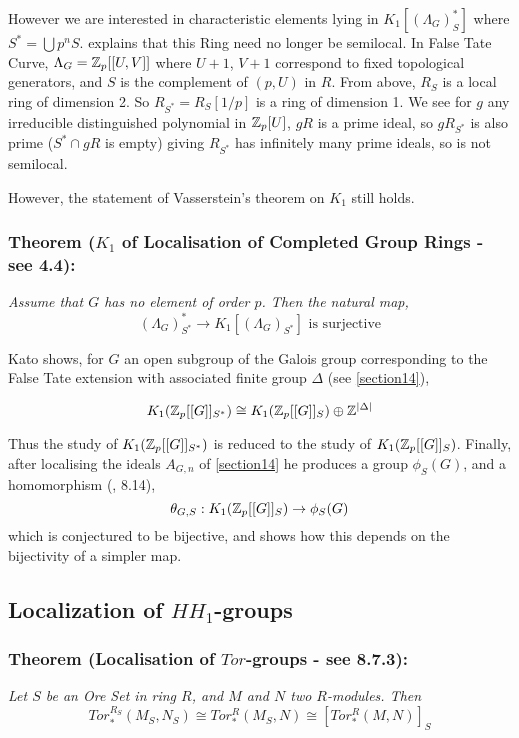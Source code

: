 However we are interested in characteristic elements lying in $K_1[(\Lambda_G)_S^*]$ where $S^* = \bigcup p^n S$. \cite{CFKSV} explains that this Ring need no longer be semilocal. In False Tate Curve, $\Lambda_G = \mathbb Z_p[[U,V]]$ where $U+1$, $V+1$ correspond to fixed topological generators, and $S$ is the complement of $(p,U)$ in $R$. From above, $R_S$ is a local ring of dimension 2. So $R_{S^*}= R_S [1/p]$ is a ring of dimension 1. We see for $g$ any irreducible distinguished polynomial in $\mathbb Z_p[U]$, $gR$ is a prime ideal, so $gR_{S^*}$ is also prime ($S^* \cap gR$ is empty) giving $R_{S^*}$ has infinitely many prime ideals, so is not semilocal.

However, the statement of Vasserstein's theorem on $K_1$ still holds.

\subsubsection*{Theorem ($K_1$ of Localisation of Completed Group Rings - see \cite{CFKSV} 4.4):}
\emph{Assume that $G$ has no element of order $p$. Then the natural map,
$$(\Lambda_G)_{S^*}^*\rightarrow K_1[(\Lambda_G)_{S^*}] \text{ is surjective}$$}

Kato shows, for $G$ an open subgroup of the Galois group corresponding to the False Tate extension with associated finite group $\Delta$ (see \ref{section14}),

$$K_1(\mathbb Z_p[[G]]_{S^*}) \cong K_1(\mathbb Z_p [[G]]_{S}) \oplus \mathbb Z^{|\Delta|}$$

Thus the study of $K_1(\mathbb Z_p[[G]]_{S^*})$ is reduced to the study of $K_1(\mathbb Z_p [[G]]_{S})$. Finally, after localising the ideals $A_{G,n}$ of \ref{section14} he produces a group $\phi_S(G)$, and a homomorphism (\cite{K}, 8.14), 
$$\theta_{G,S} : K_1(\mathbb Z_p [[G]]_{S}) \rightarrow \phi_S(G)$$
which is conjectured to be bijective, and shows how this depends on the bijectivity of a simpler map.



\subsection{Localization of $HH_1$-groups \label{12.4}}
\subsubsection*{Theorem (Localisation of $Tor$-groups - see \cite{W} 8.7.3):}
\emph{Let $S$ be an Ore Set in ring $R$, and $M$ and $N$ two $R$-modules. Then
$$Tor_*^{R_S}(M_S,N_S)\cong Tor_*^R(M_S,N)\cong  [Tor_*^R (M,N)]_S$$}

